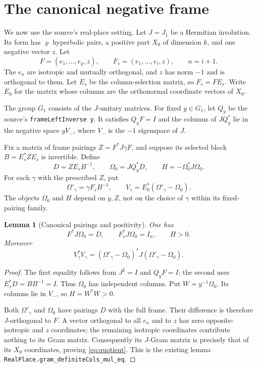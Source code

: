 \documentclass[11pt,letterpaper]{article}
\newtheorem{lemma}[theorem]{Lemma}
\theoremstyle{remark}
\newcommand{\Id}{I}
\newcommand{\code}[1]{{\small\urlstyle{tt}\nolinkurl{#1}}}
\begin{document}
\section{The canonical negative frame}\label{sec:geometry}

We now use the source's real-place setting. Let $J=J_1$ be a Hermitian involution.
Its form has $\varrho$ hyperbolic pairs, a positive part $X_0$ of dimension $k$,
and one negative vector $z$. Let
\[
 F=(e_1,\ldots,e_\varrho,z),\qquad
 F_s=(e_1,\ldots,e_i,z),\qquad n=i+1.
\]
The $e_a$ are isotropic and mutually orthogonal, and $z$ has norm $-1$ and is
orthogonal to them. Let $E_s$ be the column-selection matrix, so $F_s=FE_s$.
Write $E_0$ for the matrix whose columns are the orthonormal coordinate vectors
of $X_0$.

The group $G_1$ consists of the $J$-unitary matrices. For fixed $y\in G_1$, let
$Q_y$ be the source's \code{frameLeftInverse y}. It satisfies $Q_yF=\Id$ and
the columns of $JQ_y^*$ lie in the negative space $yV_-$, where $V_-$ is the
$-1$ eigenspace of $J$.

Fix a matrix of frame pairings
$Z=F^*J\gamma F$, and suppose its selected block
$B=E_s^*ZE_s$ is invertible. Define
\begin{equation}\label{eq:canonical}
 D=ZE_sB^{-1},\qquad
 \Omega_0=JQ_y^*D,\qquad
 H=-\Omega_0^*J\Omega_0.
\end{equation}
For each $\gamma$ with the prescribed $Z$, put
\begin{equation}\label{eq:difference}
 \Omega'_\gamma=\gamma F_sB^{-1},\qquad
 V_\gamma=E_0^*(\Omega'_\gamma-\Omega_0).
\end{equation}
The objects $\Omega_0$ and $H$ depend on $y,Z$, not on the choice of $\gamma$
within its fixed-pairing family.

\begin{lemma}[Canonical pairings and positivity]\label{lem:canonical}
One has
\[
 F^*J\Omega_0=D,\qquad F_s^*J\Omega_0=\Id_n,\qquad H>0.
\]
Moreover
\begin{equation}\label{eq:quotient}
 V_\gamma^*V_\gamma
 =(\Omega'_\gamma-\Omega_0)^*J(\Omega'_\gamma-\Omega_0).
\end{equation}
\end{lemma}

\begin{proof}
The first equality follows from $J^2=\Id$ and $Q_yF=\Id$; the second uses
$E_s^*D=BB^{-1}=\Id$. Thus $\Omega_0$ has independent columns. Put
$W=y^{-1}\Omega_0$. Its columns lie in $V_-$, so
$H=W^*W>0$.

Both $\Omega'_\gamma$ and $\Omega_0$ have pairings $D$ with the full frame.
Their difference is therefore $J$-orthogonal to $F$. A vector orthogonal to all
$e_a$ and to $z$ has zero opposite-isotropic and $z$ coordinates; the remaining
isotropic coordinates contribute nothing to its Gram matrix. Consequently its
$J$-Gram matrix is precisely that of its $X_0$ coordinates, proving
\eqref{eq:quotient}. This is the existing lemma
\code{RealPlace.gram_definiteCols_mul_eq}.
\end{proof}
\end{document}
